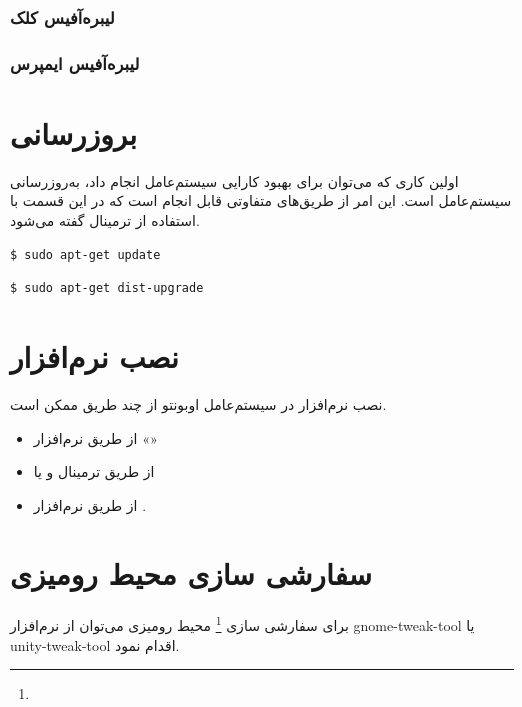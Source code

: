 \subsubsection{لیبره‌آفیس کلک}
\subsubsection{لیبره‌آفیس ایمپرس}
\section{بروزرسانی}
اولین کاری که می‌توان برای بهبود کارایی سیستم‌عامل انجام داد، به‌روزرسانی سیستم‌عامل است. این امر از طریق‌های متفاوتی قابل انجام است که در این قسمت با استفاده از ترمینال گفته می‌شود.

\begin{latin}
\begin{lstlisting}
$ sudo apt-get update
\end{lstlisting}
\end{latin}

\begin{latin}
\begin{lstlisting}
$ sudo apt-get dist-upgrade
\end{lstlisting}
\end{latin}
\section{نصب نرم‌افزار}
نصب نرم‌افزار در سیستم‌عامل اوبونتو از چند طریق ممکن است. 

\begin{itemize}
\item از طریق نرم‌افزار 
«»
\item از طریق ترمینال و یا
\item از طریق نرم‌افزار .
\end{itemize}

\section{سفارشی سازی محیط رومیزی}
برای سفارشی سازی
\footnote{}
محیط رومیزی می‌توان از نرم‌افزار gnome-tweak-tool یا unity-tweak-tool اقدام نمود.